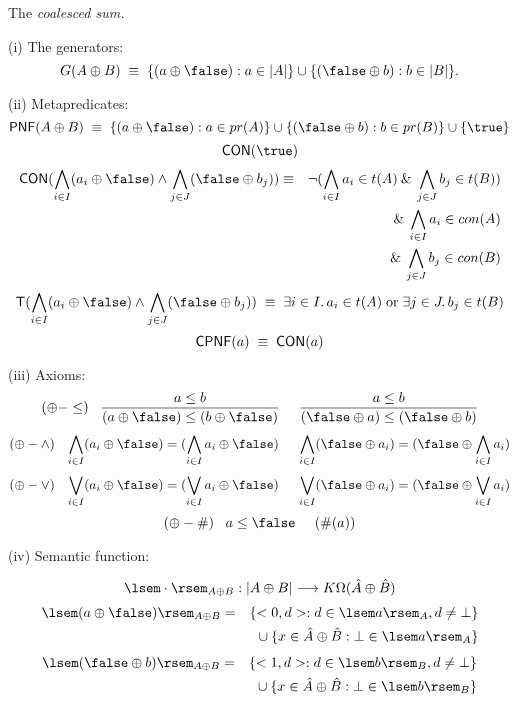 \begin{definition} 
{\rm The {\it coalesced sum.}

\noindent (i) The generators:
\[ G(A \oplus B) \; \equiv \; \{ (a \oplus \false ) : a \in |A| \} \cup \{ (\false \oplus b) : b \in |B| \}. \]

\noindent (ii) Metapredicates:
\[ {\sf PNF}(A \oplus B) \; \equiv \; \{ (a \oplus \false ) : a \in pr(A) \} \cup \{ (\false \oplus b) : b \in pr(B) \} \cup \{ \true \} \]
\[ {\sf CON}( \true ) \]
\begin{eqnarray*}
{\sf CON}( \bigwedge_{i \in I}(a_{i} \oplus \false ) \wedge \bigwedge_{j \in J}(\false \oplus b_{j})) & \equiv & 
\neg (\bigwedge_{i \in I}a_{i} \in t(A) 
\: \& \: \bigwedge_{j \in J}b_{j} \in t(B)) \\
& & \& \: \bigwedge_{i \in I}a_{i} \in con(A) \\ 
& & \& \: \bigwedge_{j \in J}b_{j} \in con(B)  
\end{eqnarray*}
\[ {\sf T}( \bigwedge_{i \in I}(a_{i} \oplus \false ) \wedge \bigwedge_{j \in J}(\false \oplus b_{j})) \; \equiv \; \exists i \in I. \, a_{i} \in t(A) \; {\rm or} \; \exists j \in J. \, b_{j} \in t(B) \]
\[ {\sf CPNF}(a) \; \equiv \; {\sf CON}(a) \]

\noindent (iii) Axioms:
\[ (\oplus - \leq ) \;\;\; \frac{a \leq b}{(a \oplus \false ) \leq (b \oplus \false )} \;\;\;\;\; \frac{a \leq b}{(\false \oplus a) \leq (\false \oplus b)} \]
\[ (\oplus - \wedge ) \;\;\; \bigwedge_{i \in I}(a_{i} \oplus \false ) = (\bigwedge_{i \in I}a_{i} \oplus \false ) \;\;\;\;\; \bigwedge_{i \in I}(\false \oplus a_{i} ) = (\false \oplus \bigwedge_{i \in I}a_{i}) \]
\[ (\oplus - \vee ) \;\;\; \bigvee_{i \in I}(a_{i} \oplus \false ) = (\bigvee_{i \in I}a_{i} \oplus \false ) \;\;\;\;\; \bigvee_{i \in I}(\false \oplus a_{i} ) = (\false \oplus \bigvee_{i \in I}a_{i}) \]
\[ (\oplus - \#) \;\;\; a \leq \false \;\;\;\;\; (\#(a)) \]

\noindent (iv) Semantic function:}
\[ \lsem \cdot \rsem_{A \oplus B} : |A \oplus B| \longrightarrow K\Omega (\hat{A} \oplus \hat{B}) \]
\begin{eqnarray*}
\lsem (a \oplus \false ) \rsem_{A \oplus B} & = &  \{ <0, d> : d \in \lsem a \rsem_{A}, d \neq \bot \} \\
& & \mbox{} \cup  \{ x \in \hat{A} \oplus \hat{B} : \bot \in \lsem a \rsem_{A} \}
\end{eqnarray*} 
\begin{eqnarray*}
\lsem (\false \oplus b) \rsem_{A \oplus B} & = & \{ <1, d> : d \in \lsem b \rsem_{B}, d \neq \bot \} \\
& & \mbox{} \cup  \{ x \in \hat{A} \oplus \hat{B} : \bot \in \lsem b \rsem_{B} \}
\end{eqnarray*} 
\end{definition}

